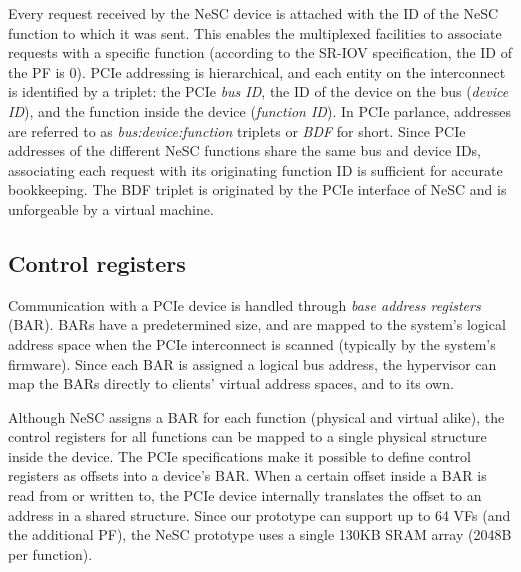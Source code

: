 Every request received by the NeSC device is attached with the ID of the NeSC function to which it was sent. This enables the multiplexed facilities to associate requests with a specific function (according to the SR-IOV specification, the ID of the PF is 0). PCIe addressing is hierarchical, and each entity on the interconnect is identified by a triplet: the PCIe \emph{bus ID}, the ID of the device on the bus (\emph{device ID}), and the function inside the device (\emph{function ID}). In PCIe parlance, addresses are referred to as \emph{bus:device:function} triplets or \emph{BDF} for short. Since PCIe addresses of the different NeSC functions share the same bus and device IDs, associating each request with its originating function ID is sufficient for accurate bookkeeping.
The BDF triplet is originated by the PCIe interface of NeSC and is unforgeable by a virtual machine.   



\subsection*{Control registers}
Communication with a PCIe device is handled through \emph{base address registers} (BAR). BARs have a predetermined size, and are mapped to the system's logical address space when the PCIe interconnect is scanned (typically by the system's firmware). Since each BAR is assigned a logical bus address, the hypervisor can map the BARs directly to clients' virtual address spaces, and to its own.

Although NeSC assigns a BAR for each function (physical and virtual alike), the control registers for all functions can be mapped to a single physical structure inside the device.
The PCIe specifications make it possible to define control registers as offsets into a device's BAR. When a certain offset inside a BAR is read from or written to, the PCIe device internally translates the offset to an address in a shared structure.
Since our prototype can support up to 64 VFs (and the additional PF), the NeSC prototype uses a single 130KB SRAM array (2048B per function).

